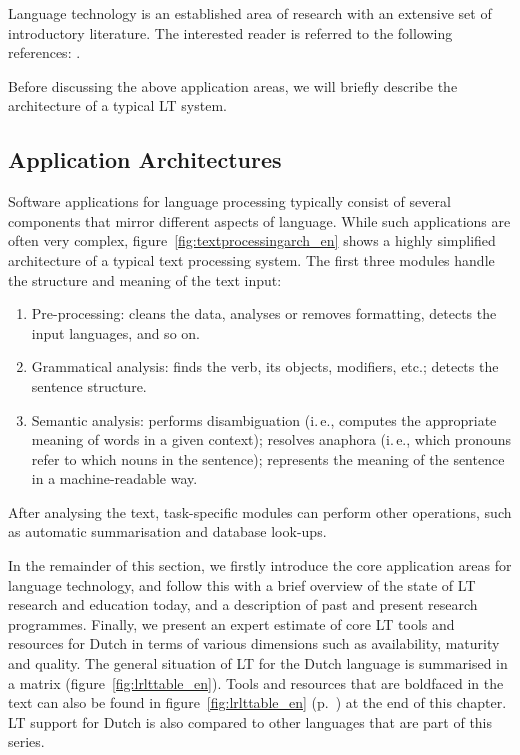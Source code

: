 \documentclass[]{../../metanetpaper}
\begin{document}
\begin{multicols}{2}
Language technology is an established area of research with an extensive set of introductory literature. The interested reader is referred to the following references:  \cite{carstensen-etal1, jurafsky-martin01, manning-schuetze1, lt-world1, lt-survey1}.

Before discussing the above application areas, we will briefly describe the architecture of a typical LT system.

\subsection{Application Architectures}

Software applications for language processing typically consist of several components that mirror different aspects of language. While such applications are often very complex, figure~\ref{fig:textprocessingarch_en} shows a highly simplified architecture of a typical text processing system. The first three modules handle the structure and meaning of the text input:

\begin{enumerate}
\item Pre-processing: cleans the data, analyses or removes formatting, detects the input languages, and so on.
\item Grammatical analysis: finds the verb, its objects, modifiers, etc.; detects the sentence structure.
\item Semantic analysis: performs disambiguation (i.\,e., computes the appropriate meaning of words in a given context); resolves anaphora (i.\,e., which pronouns refer to which nouns in the sentence); represents the meaning of the sentence in a machine-readable way.
\end{enumerate}

After analysing the text, task-specific modules can perform other operations, such as automatic summarisation and database look-ups.

In the remainder of this section, we firstly introduce the core application areas for language technology, and follow this with a brief overview of the state of LT research and education today, and a description of past and present research programmes. Finally, we present an expert estimate of core LT tools and resources for Dutch in terms of various dimensions such as availability, maturity and quality. The general situation of LT for the Dutch language is summarised in a matrix (figure~\ref{fig:lrlttable_en}). Tools and resources that are boldfaced in the text can also be found in figure~\ref{fig:lrlttable_en} (p.~\pageref{fig:lrlttable_en}) at the end of this chapter. LT support for Dutch is also compared to other languages that are part of this series.


\end{multicols}
\end{document}
